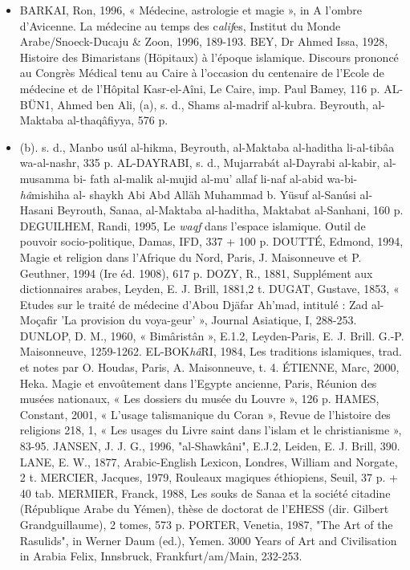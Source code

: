 \begin{itemize}
    \item 

BARKAI, Ron, 1996, « Médecine, astrologie et magie », in A l'ombre d'Avicenne. La médecine au temps des c\textit{alif}es, Institut du Monde
Arabe/Snoeck-Ducaju \& Zoon, 1996, 189-193.
BEY, Dr Ahmed Issa, 1928, Histoire des Bimaristans (Höpitaux) à l'époque islamique. Discours prononcé au Congrès Médical tenu au Caire à l'occasion du centenaire de l'Ecole de médecine et de
l'Hôpital Kasr-el-Aîni, Le Caire, imp. Paul Bamey, 116 p.
AL-BÜN1, Ahmed ben Ali, (a), s. d., Shams al-madrif al-kubra.
Beyrouth, al-Maktaba al-thaqâfiyya, 576 p.
\item (b). s. d., Manbo usúl al-hikma, Beyrouth, al-Maktaba al-haditha
li-al-tibâa wa-al-nashr, 335 p.
AL-DAYRABI, s. d., Mujarrabát al-Dayrabi al-kabir, al-musamma bi-
fath al-malik al-mujid al-mu' allaf li-naf al-abid wa-bi-\textit{hâ}mishiha al-
shaykh Abi Abd Alläh Muhammad b. Yüsuf al-Sanúsi al-Hasani
Beyrouth, Sanaa, al-Maktaba al-haditha, Maktabat al-Sanhani, 160 p.
DEGUILHEM, Randi, 1995, Le \textit{waqf} dans l'espace islamique. Outil de pouvoir socio-politique, Damas, IFD, 337 + 100 p.
DOUTTÉ, Edmond, 1994, Magie et religion dans l'Afrique du Nord, Paris, J. Maisonneuve et P. Geuthner, 1994 (Ire éd. 1908), 617 p.
DOZY, R., 1881, Supplément aux dictionnaires arabes, Leyden, E. J.
Brill, 1881,2 t.
DUGAT, Gustave, 1853, « Etudes sur le traité de médecine d'Abou
Djäfar Ah'mad, intitulé : Zad al-Moçafir 'La provision du voya-geur' », Journal Asiatique, I, 288-253.
DUNLOP, D. M., 1960, « Bimâristân », E.1.2, Leyden-Paris, E. J. Brill.
G.-P. Maisonneuve, 1259-1262.
EL-BOK\textit{hâ}RI, 1984, Les traditions islamiques, trad. et notes par O.
Houdas, Paris, A. Maisonneuve, t. 4.
ÉTIENNE, Marc, 2000, Heka. Magie et envoûtement dans l'Egypte ancienne, Paris, Réunion des musées nationaux, « Les dossiers du musée du Louvre », 126 p.
HAMES, Constant, 2001, « L'usage talismanique du Coran », Revue de l'histoire des religions 218, 1, « Les usages du Livre saint dans l'islam et le christianisme », 83-95.
JANSEN, J. J. G., 1996, "al-Shawkâni", E.J.2, Leiden, E. J. Brill, 390.
LANE, E. W., 1877, Arabic-English Lexicon, Londres, William and
Norgate, 2 t.
MERCIER, Jacques, 1979, Rouleaux magiques éthiopiens, Seuil, 37 p. +
40 tab.
MERMIER, Franck, 1988, Les souks de Sanaa et la société citadine (République Arabe du Yémen), thèse de doctorat de l'EHESS (dir.
Gilbert Grandguillaume), 2 tomes, 573 p.
PORTER, Venetia, 1987, "The Art of the Rasulids", in Werner Daum (ed.), Yemen. 3000 Years of Art and Civilisation in Arabia Felix, Innsbruck, Frankfurt/am/Main, 232-253.

\end{itemize}
